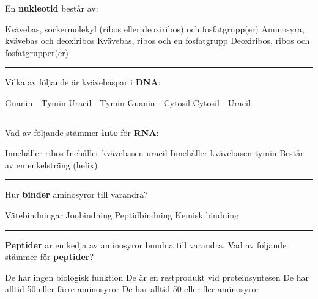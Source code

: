 \documentclass{exam}
\begin{document}
\vspace{5mm} %
\begin{center}
\end{center}
\vspace{5mm} %

\begin{questions}

\question En \textbf{nukleotid} består av:
\begin{checkboxes}
   \choice Kvävebas, sockermolekyl (ribos eller deoxiribos) och fosfatgrupp(er)
   \choice Aminosyra, kvävebas och deoxiribos
   \choice Kvävebas, ribos och en fosfatgrupp
   \choice Deoxiribos, ribos och fosfatgrupper(er)
\end{checkboxes} 

\vspace{5mm} %
\hrule 
\vspace{5mm} %
\question Vilka av följande är kvävebaspar i \textbf{DNA}:
\begin{checkboxes}
   \choice Guanin - Tymin
   \choice Uracil - Tymin
   \choice Guanin - Cytosil
   \choice Cytosil - Uracil
\end{checkboxes}

\vspace{5mm} %
\hrule 
\vspace{5mm} %
\question Vad av följande stämmer \textbf{inte} för \textbf{RNA}:
\begin{checkboxes}
   \choice Innehåller ribos
   \choice Inehåller kvävebasen uracil
   \choice Innehåller kvävebasen tymin
   \choice Består av en enkelsträng (helix)
\end{checkboxes}

\vspace{5mm} %
\hrule 
\vspace{5mm} %
\question Hur \textbf{binder} aminosyror till varandra?
\begin{checkboxes}
   \choice Vätebindningar
   \choice Jonbindning
   \choice Peptidbindning
   \choice Kemisk bindning
\end{checkboxes}

\vspace{5mm} %
\hrule 
\vspace{5mm} %
\question \textbf{Peptider} är en kedja av aminosyror bundna till varandra. Vad av följande stämmer för \textbf{peptider}?  
\begin{checkboxes}
   \choice De har ingen biologisk funktion
   \choice De är en restprodukt vid proteinsyntesen
   \choice De har alltid 50 eller färre aminosyror
   \choice De har alltid 50 eller fler aminosyror
\end{checkboxes}
\break


\end{questions}
\end{document}
